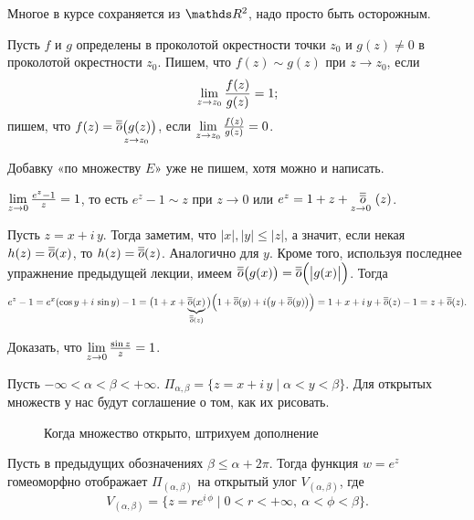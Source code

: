 Многое в курсе сохраняется из $\R^2$, надо просто быть осторожным.
\begin{Def}
	Пусть $f$ и $g$ определены в проколотой окрестности точки $z_0$ и $g(z)\ne 0$ в проколотой окрестности $z_0$. Пишем, что $f(z)\sim g(z)$ при $z\to z_0$, если
	\[
		\yo z{z_0}\frac{f(z)}{g(z)} = 1;
	\]
	пишем, что $f(z) = \ooob{g(z)}{z\to z_0}$, если $\yo z{z_0}\frac{f(z)}{g(z)} = 0$.
\end{Def}
Добавку «по множеству $E$» уже не пишем, хотя можно и написать.
\begin{Pre}
	$\yo z0\frac{e^z-1}z = 1$, то есть $e^z - 1\sim z$ при $z\to 0$ или $e^z = 1+ z + \ooo z{z\to0}$.
\end{Pre}
\begin{Proof}
	Пусть $z = x+i\, y$. Тогда заметим, что $|x|,|y|\le |z|$, а значит, если некая $h(z) = \oo(x)$, то $h(z) = \oo(z)$. Аналогично для $y$. Кроме того, используя последнее упражнение предыдущей лекции, имеем $\oo\big(g(x)\big) = \oo\Big(\big|g(x)\big|\Big)$. Тогда
	\[
		e^z - 1 = e^x(\cos y + i\,\sin y) - 1 =
		\big(1 + x + \underbrace{\oo(x)}_{\oo(z)}\big)\Big(1 + \oo(y) + i \big(y + \oo(y)\big)\Big) =
		1+ x + i\,y + \oo(z) - 1 = z + \oo(z).
	\]
\end{Proof}
\begin{Task}
	Доказать, что $\yo z0\frac{\sin z}z = 1$.
\end{Task}
Пусть $-\infty<\alpha<\beta<+\infty$. $\Pi_{\alpha,\beta} = \{z = x + i\, y\mid \alpha < y <\beta\}$. Для открытых множеств у нас будут соглашение о том, как их рисовать.
\begin{figure}[H]
	\centering
	\caption{Когда множество открыто, штрихуем дополнение}
	\label{fig:3}
\end{figure}
\begin{Ut}
	Пусть в предыдущих обозначениях $\beta\le \alpha + 2\pi$. Тогда функция $w = e^z$ гомеоморфно отображает $\Pi_{(\alpha,\beta)}$ на открытый улог $V_{(\alpha,\beta)}$, где
	\[
		V_{(\alpha,\beta)} = \{z = r e^{i\,\phi}\mid 0< r<+\infty,\ \alpha<\phi<\beta\}.
	\]
\end{Ut}
